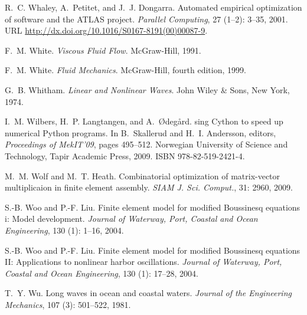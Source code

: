 \begin{thebibliography}{467}
R.~C. Whaley, A.~Petitet, and J.~J. Dongarra.
\newblock Automated empirical optimization of software and the {ATLAS} project.
\newblock \emph{Parallel Computing}, 27 (1--2): 3--35, 2001.
\newblock URL \url{http://dx.doi.org/10.1016/S0167-8191(00)00087-9}.

F.~M. White.
\newblock \emph{Viscous Fluid Flow}.
\newblock McGraw-Hill, 1991.

F.~M. White.
\newblock \emph{Fluid Mechanics}.
\newblock McGraw-Hill, fourth edition, 1999.

G.~B. Whitham.
\newblock \emph{Linear and Nonlinear Waves}.
\newblock John Wiley \& Sons, New York, 1974.

I.~M. Wilbers, H.~P. Langtangen, and A.~{\O}deg{\aa}rd.
sing {C}ython to speed up numerical {P}ython programs.
\newblock In B.~Skallerud and H.~I. Andersson, editors, \emph{Proceedings of
  MekIT'09}, pages 495--512. Norwegian University of Science and Technology,
  Tapir Academic Press, 2009.
\newblock ISBN 978-82-519-2421-4.

M.~M. Wolf and M.~T. Heath.
\newblock Combinatorial optimization of matrix-vector multiplicaion in finite
  element assembly.
\newblock \emph{SIAM J. Sci. Comput.}, 31: 2960, 2009.

S.-B. Woo and P.-F. Liu.
\newblock Finite element model for modified {B}oussinesq equations i: Model
  development.
\newblock \emph{Journal of Waterway, Port, Coastal and Ocean Engineering},
  130 (1): 1--16, 2004{}.

S.-B. Woo and P.-F. Liu.
\newblock Finite element model for modified {B}oussinesq equations {II}:
  {A}pplications to nonlinear harbor oscillations.
\newblock \emph{Journal of Waterway, Port, Coastal and Ocean Engineering},
  130 (1): 17--28, 2004{}.

T.~Y. Wu.
\newblock Long waves in ocean and coastal waters.
\newblock \emph{Journal of the Engineering Mechanics}, 107
  (3): 501--522, 1981.


\end{thebibliography}
